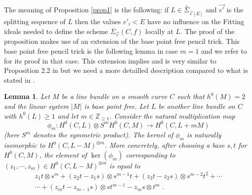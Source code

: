 \documentclass{article}
\newtheorem{lemma}{Lemma}
\theoremstyle{definition}
\theoremstyle{remark}
\begin{document}
The meaning of Proposition \ref{prop1} is the following: if $L \in \overset{\circ}{\Sigma}_{\overrightarrow {e}[E]}$ and $\overrightarrow {e'}$ is the splitting sequence of $L$ then the values $e'_i <E$ have no influence on the Fitting ideals needed to define the scheme $\overline{\Sigma}_{\overrightarrow {e}}(C,f)$ locally at $L$.
The proof of the proposition makes use of an extension of the base point free pencil trick.
This base point free pencil trick is the following lemma in case $m=1$ and we refer to \cite{ref9} for its proof in that case.
This extension implies and is very similar to Proposition 2.2 in \cite{FFR} but we need a more detailled description compared to what is stated in \cite{FFR}.

\begin{lemma}\label{lemma1}
Let $M$ be a line bundle on a smooth curve $C$ such that $h^0(M)=2$ and the linear system $\vert M \vert$ is base point free.
Let $L$ be another line bundle on $C$ with $h^0(L)\geq 1$ and let $m \in \mathbb{Z}_{\geq 1}$.
Consider the natural multiplication map
\[
\phi _m : H^0(C,L) \otimes S^m H^0(C,M) \rightarrow H^0 (C, L+mM)
\]
(here $S^m$ denotes the symmetric product).
The kernel of $\phi _m$ is naturally isomorphic to $H^0(C,L-M)^{\oplus m}$.
More concretely, after choosing a base $s,t$ for $H^0(C,M)$, the element of $\ker (\phi _m)$ corresponding to $(z_1, \cdots, z_m) \in H^0(C,L-M)^{\oplus m}$ is equal to
\begin{multline*}
z_1t \otimes s^m +(z_2t-z_1s) \otimes s^{m-1}t + (z_3t-z_2s)\otimes s^{m-2}t^2 + \cdots\\
\cdots + (z_mt-z_{m-1}s) \otimes st^{m-1}-z_ms\otimes t^m \text { .}
\end{multline*}
\end{lemma}
\end{document}
